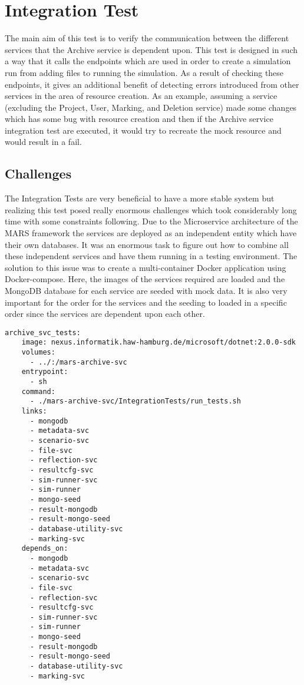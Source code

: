 \section{Integration Test}
The main aim of this test is to verify the communication between the different services that the Archive service is dependent upon. This test is designed in 
such a way that it calls the endpoints which are used in order to create a simulation run from adding files to running the simulation. As a result of checking
these endpoints, it gives an additional benefit of detecting errors introduced from other services in the area of resource creation. As an example, assuming a service
(excluding the Project, User, Marking, and Deletion service)
made some changes which has some bug with resource creation and then if the Archive service integration test are executed, it would try to recreate the mock resource
and would result in a fail.

\subsection{Challenges}
The Integration Tests are very beneficial to have a more stable system but realizing this test posed really enormous challenges which took considerably long time 
with some constraints following. Due to the Microservice architecture of the MARS framework the services are deployed as an independent entity which have their own databases.
It was an enormous task to figure out how to combine all these independent services and have them running in a testing environment. The solution to this issue
was to create a multi-container Docker application using Docker-compose. Here, the images of the services required are loaded and the MongoDB database for each
service are seeded with mock data. It is also very important for the order for the services and the seeding to loaded in a specific order since the services are dependent upon
each other.  

\begin{lstlisting}[language=docker-compose,caption={Docker compose configuration snippet for Archive service Integration Test}, captionpos=b, breaklines=true,label={code:integCompose}]
archive_svc_tests:
    image: nexus.informatik.haw-hamburg.de/microsoft/dotnet:2.0.0-sdk
    volumes:
      - ../:/mars-archive-svc
    entrypoint:
      - sh
    command:
      - ./mars-archive-svc/IntegrationTests/run_tests.sh
    links:
      - mongodb
      - metadata-svc
      - scenario-svc
      - file-svc
      - reflection-svc
      - resultcfg-svc
      - sim-runner-svc
      - sim-runner
      - mongo-seed
      - result-mongodb
      - result-mongo-seed
      - database-utility-svc
      - marking-svc
    depends_on:
      - mongodb
      - metadata-svc
      - scenario-svc
      - file-svc
      - reflection-svc
      - resultcfg-svc
      - sim-runner-svc
      - sim-runner
      - mongo-seed
      - result-mongodb
      - result-mongo-seed
      - database-utility-svc
      - marking-svc
\end{lstlisting}      

